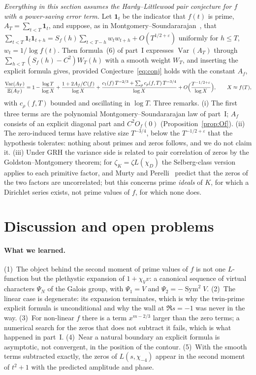 \documentclass[11pt,a4paper]{article}
\theoremstyle{remark}\newtheorem{remark}[theorem]{Remark}
\providecommand{\Var}{\operatorname{Var}}\providecommand{\E}{\mathbb{E}}
\newcommand{\Sym}{\operatorname{Sym}}\newcommand{\Res}{\operatorname*{Res}}
\begin{document}
\emph{Everything in this section assumes the Hardy--Littlewood pair conjecture for $f$ with a power-saving
error term.} Let $\mathbf 1_t$ be the indicator that $f(t)$ is prime, $A_T=\sum_{t<T}\mathbf 1_t$, and suppose,
as in Montgomery--Soundararajan~\cite{MontgomerySoundararajan2004}, that
$\sum_{t<T}\mathbf 1_t\mathbf 1_{t+h}=S_f(h)\sum_{t<T-h}w_tw_{t+h}+O(T^{1/2+\varepsilon})$ uniformly for $h\le T$,
$w_t=1/\log f(t)$. Then formula~(6) of part~I expresses $\Var(A_T)$ through $\sum_{h<T}(S_f(h)-C^2)W_T(h)$ with a
smooth weight $W_T$, and inserting the explicit formula gives, provided Conjecture~\eqref{eq:conj} holds with
the constant $A_f$,
\[
\frac{\Var(A_T)}{\E(A_T)}=1-\frac{\log T}{\log X}+\frac{1+2A_f/C(f)}{\log X}+\frac{c_1(f)\,T^{-2/3}+\sum_\rho c_\rho(f,T)\,T^{-3/4}}{\log X}
+O\Bigl(\frac{T^{-1/2+\varepsilon}}{\log X}\Bigr),\qquad X\approx f(T),
\]
with $c_\rho(f,T)$ bounded and oscillating in $\log T$. Three remarks. (i) The first three terms are the
polynomial Montgomery--Soundararajan law of part~I; $A_f$ consists of an explicit diagonal part and
$C^2O_f(0)$ (Proposition~\ref{prop:Of}). (ii) The zero-induced terms have relative size $T^{-3/4}$, below the
$T^{-1/2+\varepsilon}$ that the hypothesis tolerates: nothing about primes and zeros follows, and we do not
claim it. (iii) Under GRH the variance side is related to pair correlation of zeros by the
Goldston--Montgomery theorem; for $\zeta_K=\zeta L(\chi_D)$ the Selberg-class version~\cite{BuiKeatingSmith2016}
applies to each primitive factor, and Murty and Perelli~\cite{MurtyPerelli1999} predict that the zeros of the
two factors are uncorrelated; but this concerns prime \emph{ideals} of $K$, for which a Dirichlet series
exists, not prime values of $f$, for which none does.

\section{Discussion and open problems}\label{sec:disc}

\paragraph{What we learned.} (1)~The object behind the second moment of prime values of $f$ is not one
$L$-function but the plethystic expansion of $1+\chi_Vv$: a canonical sequence of virtual characters $\Psi_N$
of the Galois group, with $\Psi_1=V$ and $\Psi_2=-\Sym^2V$. (2)~The linear case is degenerate: its expansion
terminates, which is why the twin-prime explicit formula is unconditional and why the wall at $\Re s=-1$ was
never in the way. (3)~For non-linear $f$ there is a term $x^{m-2/3}$ larger than the zero terms; a numerical
search for the zeros that does not subtract it fails, which is what happened in part~I. (4)~Near a natural
boundary an explicit formula is asymptotic, not convergent, in the position of the contour. (5)~With the
smooth terms subtracted exactly, the zeros of $L(s,\chi_{-4})$ appear in the second moment of $t^2+1$ with the
predicted amplitude and phase.
\end{document}
